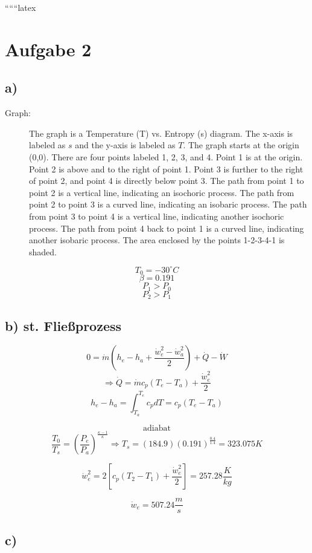
``````latex


\section*{Aufgabe 2}

\subsection*{a)}

\begin{description}
    \item[Graph:] The graph is a Temperature (T) vs. Entropy (s) diagram. The x-axis is labeled as $s$ and the y-axis is labeled as $T$. The graph starts at the origin (0,0). There are four points labeled 1, 2, 3, and 4. Point 1 is at the origin. Point 2 is above and to the right of point 1. Point 3 is further to the right of point 2, and point 4 is directly below point 3. The path from point 1 to point 2 is a vertical line, indicating an isochoric process. The path from point 2 to point 3 is a curved line, indicating an isobaric process. The path from point 3 to point 4 is a vertical line, indicating another isochoric process. The path from point 4 back to point 1 is a curved line, indicating another isobaric process. The area enclosed by the points 1-2-3-4-1 is shaded.
\end{description}

\[
T_0 = -30^\circ C
\]
\[
\beta = 0.191
\]
\[
P_1 > P_0
\]
\[
P_2 > P_1
\]

\subsection*{b) st. Fließprozess}

\[
0 = \dot{m} (h_e - h_a + \frac{\dot{w}_e^2 - \dot{w}_a^2}{2}) + \dot{Q} - \dot{W}
\]
\[
\Rightarrow \dot{Q} = \dot{m} c_p (T_e - T_a) + \frac{\dot{w}_e^2}{2}
\]
\[
h_e - h_a = \int_{T_a}^{T_e} c_p dT = c_p (T_e - T_a)
\]

\[
\text{adiabat}
\]
\[
\frac{T_0}{T_s} = (\frac{P_e}{P_a})^{\frac{\kappa - 1}{\kappa}} \Rightarrow T_s = (184.9) (0.191)^{\frac{0.4}{1.4}} = 323.075 K
\]

\[
\dot{w}_e^2 = 2 \left[ c_p (T_2 - T_1) + \frac{\dot{w}_e^2}{2} \right] = 257.28 \frac{K}{kg}
\]

\[
\dot{w}_e = 507.24 \frac{m}{s}
\]

\subsection*{c)}

